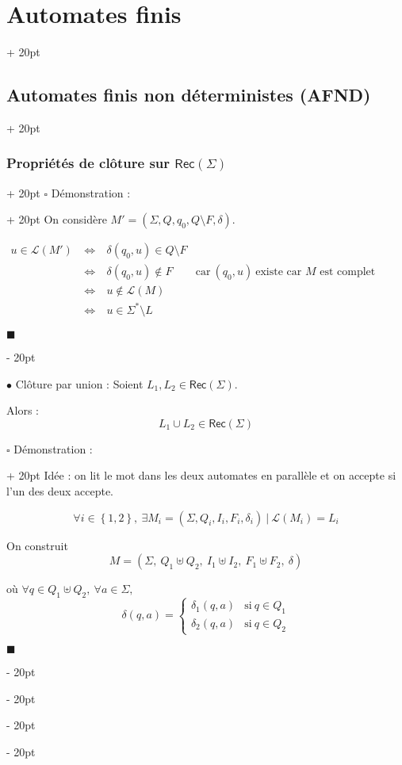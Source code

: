 \documentclass[a4paper, 12pt, twoside]{article}
\newcommand{\lr}[1]{\left( #1 \right)}
\newcommand{\set}[1]{\left\{ #1 \right\}}
\newcommand{\ssi}{\ \Leftrightarrow \ }
\newcommand{\ind}[1][20pt]{\advance\leftskip + #1}
\newcommand{\deind}[1][20pt]{\advance\leftskip - #1}
\newenvironment{indt}[2][20pt]{#2 \par \ind[#1]}{\par \deind} %
\newenvironment{proof}[1][{Démonstration :}]{\begin{indt}{$\square$ #1}}{$\blacksquare$ \end{indt}}
\newcommand{\Rec}[1]{\mathsf{Rec}\!\lr{#1}}
\begin{document}
\begin{indt}{\section{Automates finis}}
\begin{indt}{\subsection{Automates finis non déterministes (AFND)}}
\begin{indt}{\subsubsection{Propriétés de clôture sur $\Rec \Sigma$}}
\begin{proof}
                    On considère $M' = (\Sigma, Q, q_0, Q \setminus F, \delta)$.

                    \(
                        \begin{array}{rcll}
                            u \in \mathcal L(M')
                            &\ssi& \delta(q_0, u) \in Q \setminus F
                            \\
                            &\ssi& \delta(q_0, u) \notin F
                            & \text{car}\ (q_0, u)\  \text{existe car $M$ est complet}
                            \\
                            &\ssi& u \notin \mathcal L(M)
                            \\
                            &\ssi& u \in \Sigma^* \setminus L
                        \end{array}
                    \)

                \end{proof}

                \vspace{12pt}
                
                $\bullet$ Clôture par union : Soient $L_1, L_2 \in \Rec \Sigma$.

                Alors :
                \[
                    L_1 \cup L_2 \in \Rec \Sigma
                \]

                \begin{proof}
                    Idée : on lit le mot dans les deux automates en parallèle et on accepte si l'un des deux accepte.

                    \[
                        \forall i \in \set{1, 2},\ \exists M_i = (\Sigma, Q_i, I_i, F_i, \delta_i)\ |\ \mathcal L(M_i) = L_i
                    \]

                    On construit
                    \[
                        M = \lr{\Sigma,\ Q_1 \uplus Q_2,\ I_1 \uplus I_2,\ F_1 \uplus F_2,\ \delta}
                    \]

                    où $\forall q \in Q_1 \uplus Q_2,\ \forall a \in \Sigma,$
                    \[
                        \delta(q, a) =
                        \begin{cases}
                            \delta_1(q, a)
                            & \text{si}\ q \in Q_1
                            \\
                            \delta_2(q, a)
                            & \text{si}\ q \in Q_2
                        \end{cases}
                    \]


\end{proof}
\end{indt}
\end{indt}
\end{indt}
\end{document}
